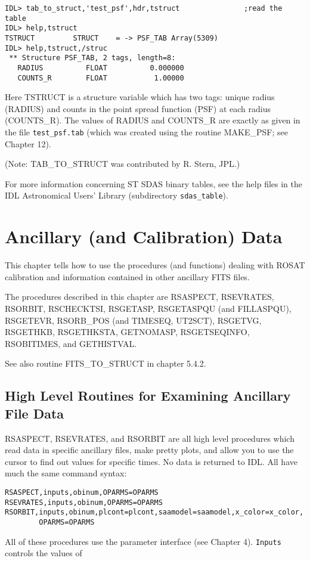 \medskip\noindent
\begin{verbatim}
IDL> tab_to_struct,'test_psf',hdr,tstruct               ;read the table
IDL> help,tstruct
TSTRUCT         STRUCT    = -> PSF_TAB Array(5309)
IDL> help,tstruct,/struc
 ** Structure PSF_TAB, 2 tags, length=8:
   RADIUS          FLOAT          0.000000
   COUNTS_R        FLOAT           1.00000
\end{verbatim}
Here TSTRUCT is a structure variable which  has two tags: unique radius
(RADIUS) and counts in the point spread function (PSF) at each radius
(COUNTS{\_}R). The values of RADIUS and COUNTS{\_}R are exactly as given in the
file {\tt test{\_}psf.tab} (which was created using the routine MAKE{\_}PSF; see
Chapter 12).
 
(Note: TAB{\_}TO{\_}STRUCT was contributed by R. Stern, JPL.)
 
For more information concerning ST SDAS binary tables, see the help files in
the IDL Astronomical Users' Library (subdirectory {\tt sdas{\_}table}).
 
\chapter{Ancillary (and Calibration) Data }
 
This chapter tells how to use the procedures (and functions) dealing with ROSAT
calibration and information contained in other ancillary FITS files.
 
The procedures described in this chapter are RSASPECT, RSEVRATES, RSORBIT,
RSCHECKTSI, RSGETASP, RSGETASPQU (and FILLASPQU), RSGETEVR, RSORB{\_}POS (and
TIMESEQ, UT2SCT), RSGETVG, RSGETHKB, RSGETHKSTA, GETNOMASP, RSGETSEQINFO,
RSOBITIMES, and GETHISTVAL.
 
See also routine FITS{\_}TO{\_}STRUCT in chapter 5.4.2.
 

\section{High Level Routines for Examining Ancillary File Data}
 
RSASPECT, RSEVRATES, and RSORBIT are all high level procedures which read data
in specific ancillary files, make pretty plots, and allow you to use the cursor
to find out values for specific times. No data is returned to IDL. All have
much the same command syntax:

\medskip\noindent
\begin{verbatim}
RSASPECT,inputs,obinum,OPARMS=OPARMS
RSEVRATES,inputs,obinum,OPARMS=OPARMS
RSORBIT,inputs,obinum,plcont=plcont,saamodel=saamodel,x_color=x_color,
        OPARMS=OPARMS
\end{verbatim}
All of these procedures use the parameter interface (see Chapter 4). {\tt Inputs}
controls the values of

